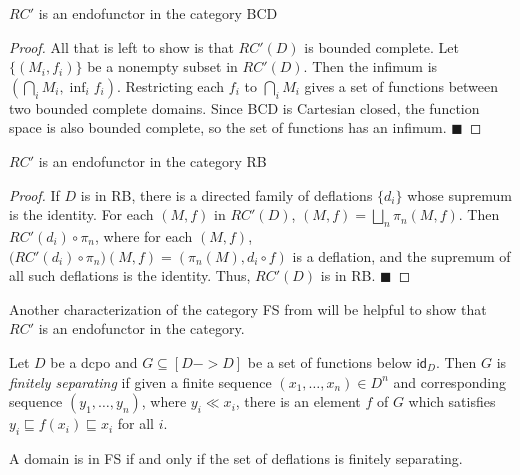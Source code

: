 \begin{theorem}
$RC'$ is an endofunctor in the category \textsf{BCD}
\end{theorem}
\begin{proof}
All that is left to show is that $RC'(D)$ is bounded complete.  Let $\{(M_i,f_i)\}$ be a nonempty subset in $RC'(D)$.  Then the infimum is $(\bigcap_i M_i, \inf_i f_i)$.  Restricting each $f_i$ to $\bigcap_i M_i$ gives a set of functions between two bounded complete domains.  Since \textsf{BCD} is Cartesian closed, the function space is also bounded complete, so the set of functions has an infimum.
\hfill $\blacksquare$
\end{proof}

\begin{theorem}
$RC'$ is an endofunctor in the category \textsf{RB}
\end{theorem}
\begin{proof}
If $D$ is in \textsf{RB}, there is a directed family of deflations $\{d_i\}$ whose supremum is the identity.  For each $(M,f)$ in $RC'(D)$, $(M,f) = \bigsqcup_n \pi_n(M,f)$.  Then $RC'(d_i)\circ \pi_n$, where for each $(M,f)$, $\bigl(RC'(d_i)\circ \pi_n\bigr)(M,f) = (\pi_n(M), d_i\circ f)$ is a deflation, and the supremum of all such deflations is the identity.  Thus, $RC'(D)$ is in \textsf{RB}.
\hfill $\blacksquare$
\end{proof}

Another characterization of the category \textsf{FS} from \cite{jung1989cartesian} will be helpful to show that $RC'$ is an endofunctor in the category.

\begin{definition}
Let $D$ be a dcpo and $G\subseteq [D->D]$ be a set of functions below $\textsf{id}_D$.  Then $G$ is \emph{finitely separating} if given a finite sequence $(x_1,\ldots, x_n)\in D^n$ and corresponding sequence $(y_1,\ldots, y_n)$, where $y_i\ll x_i$, there is an element $f$ of $G$ which satisfies $y_i\sqsubseteq f(x_i)\sqsubseteq x_i$ for all $i$.
\end{definition}

\begin{theorem}
A domain is in \textsf{FS} if and only if the set of deflations is finitely separating.
\end{theorem}
%

